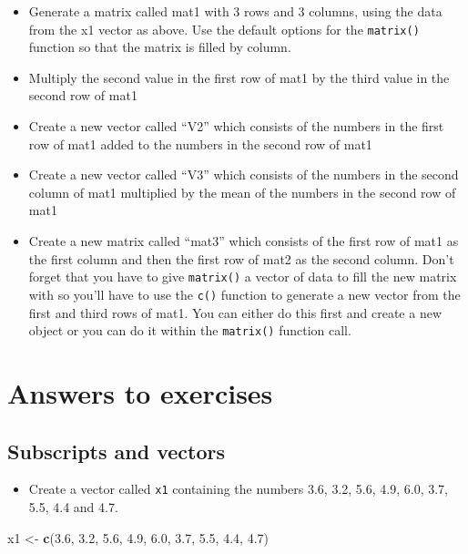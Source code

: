 \documentclass[
]{book}
\newenvironment{Shaded}{\begin{snugshade}}{\end{snugshade}}
\newcommand{\FloatTok}[1]{\textcolor[rgb]{0.00,0.00,0.81}{#1}}
\newcommand{\KeywordTok}[1]{\textcolor[rgb]{0.13,0.29,0.53}{\textbf{#1}}}
\newcommand{\NormalTok}[1]{#1}
\newcommand{\StringTok}[1]{\textcolor[rgb]{0.31,0.60,0.02}{#1}}
\providecommand{\tightlist}{%
  \setlength{\itemsep}{0pt}\setlength{\parskip}{0pt}}
\begin{document}
\begin{itemize}
\item
  Generate a matrix called mat1 with 3 rows and 3 columns, using the data from the x1 vector as above. Use the default options for the \texttt{matrix()} function so that the matrix is filled by column.
\item
  Multiply the second value in the first row of mat1 by the third value in the second row of mat1
\item
  Create a new vector called ``V2'' which consists of the numbers in the first row of mat1 added to the numbers in the second row of mat1
\item
  Create a new vector called ``V3'' which consists of the numbers in the second column of mat1 multiplied by the mean of the numbers in the second row of mat1
\item
  Create a new matrix called ``mat3'' which consists of the first row of mat1 as the first column and then the first row of mat2 as the second column. Don't forget that you have to give \texttt{matrix()} a vector of data to fill the new matrix with so you'll have to use the \texttt{c()} function to generate a new vector from the first and third rows of mat1. You can either do this first and create a new object or you can do it within the \texttt{matrix()} function call.
\end{itemize}

\hypertarget{answers-to-exercises-2}{%
\section{Answers to exercises}\label{answers-to-exercises-2}}

\hypertarget{subscripts-and-vectors-1}{%
\subsection{Subscripts and vectors}\label{subscripts-and-vectors-1}}

\begin{itemize}
\tightlist
\item
  Create a vector called \texttt{x1} containing the numbers 3.6, 3.2, 5.6, 4.9, 6.0, 3.7, 5.5, 4.4 and 4.7.
\end{itemize}

\begin{Shaded}
\begin{Highlighting}[]
\NormalTok{x1 <-}\StringTok{ }\KeywordTok{c}\NormalTok{(}\FloatTok{3.6}\NormalTok{, }\FloatTok{3.2}\NormalTok{, }\FloatTok{5.6}\NormalTok{, }\FloatTok{4.9}\NormalTok{, }\FloatTok{6.0}\NormalTok{, }\FloatTok{3.7}\NormalTok{, }\FloatTok{5.5}\NormalTok{, }\FloatTok{4.4}\NormalTok{, }\FloatTok{4.7}\NormalTok{)}
\end{Highlighting}
\end{Shaded}
\end{document}

